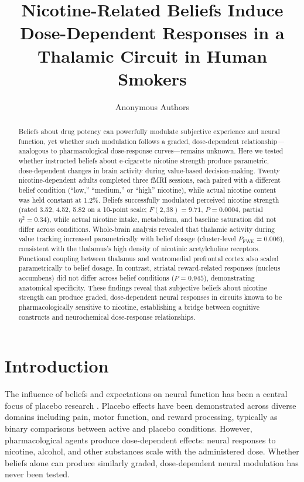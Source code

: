 \documentclass[12pt]{article}
\title{Nicotine-Related Beliefs Induce Dose-Dependent Responses in a Thalamic Circuit in Human Smokers}
\author{Anonymous Authors}
\date{}
\begin{document}
\maketitle

\begin{abstract}
Beliefs about drug potency can powerfully modulate subjective experience and neural function, yet whether such modulation follows a graded, dose-dependent relationship---analogous to pharmacological dose-response curves---remains unknown. Here we tested whether instructed beliefs about e-cigarette nicotine strength produce parametric, dose-dependent changes in brain activity during value-based decision-making. Twenty nicotine-dependent adults completed three fMRI sessions, each paired with a different belief condition (``low,'' ``medium,'' or ``high'' nicotine), while actual nicotine content was held constant at 1.2\%. Beliefs successfully modulated perceived nicotine strength (rated 3.52, 4.52, 5.82 on a 10-point scale; $F(2,38) = 9.71$, $P = 0.0004$, partial $\eta^2 = 0.34$), while actual nicotine intake, metabolism, and baseline saturation did not differ across conditions. Whole-brain analysis revealed that thalamic activity during value tracking increased parametrically with belief dosage (cluster-level $P_{\text{FWE}} = 0.006$), consistent with the thalamus's high density of nicotinic acetylcholine receptors. Functional coupling between thalamus and ventromedial prefrontal cortex also scaled parametrically to belief dosage. In contrast, striatal reward-related responses (nucleus accumbens) did not differ across belief conditions ($P = 0.945$), demonstrating anatomical specificity. These findings reveal that subjective beliefs about nicotine strength can produce graded, dose-dependent neural responses in circuits known to be pharmacologically sensitive to nicotine, establishing a bridge between cognitive constructs and neurochemical dose-response relationships.
\end{abstract}

\section{Introduction}

The influence of beliefs and expectations on neural function has been a central focus of placebo research \citep{wager2004placebo, benedetti2005neurobiological, colloca2013placebo}. Placebo effects have been demonstrated across diverse domains including pain, motor function, and reward processing, typically as binary comparisons between active and placebo conditions. However, pharmacological agents produce dose-dependent effects: neural responses to nicotine, alcohol, and other substances scale with the administered dose. Whether beliefs alone can produce similarly graded, dose-dependent neural modulation has never been tested.
\end{document}
